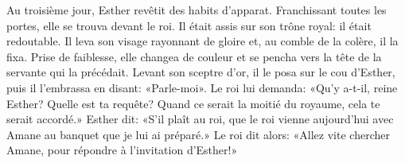 Au troisième jour, Esther revêtit des habits d’apparat.
	Franchissant toutes les portes, elle se trouva devant le roi.
	Il était assis sur son trône royal: il était redoutable.
Il leva son visage rayonnant de gloire et, au comble de la colère, il la fixa.
Prise de faiblesse, elle changea de couleur
	et se pencha vers la tête de la servante qui la précédait.
Levant son sceptre d’or, il le posa sur le cou d’Esther,
	puis il l’embrassa en disant: «Parle-moi».
Le roi lui demanda:
	«Qu’y a-t-il, reine Esther? Quelle est ta requête?
	Quand ce serait la moitié du royaume, cela te serait accordé.»
Esther dit: «S’il plaît au roi,
	que le roi vienne aujourd’hui avec Amane au banquet que je lui ai préparé.»
Le roi dit alors: «Allez vite chercher Amane, pour répondre à l’invitation d’Esther!»
